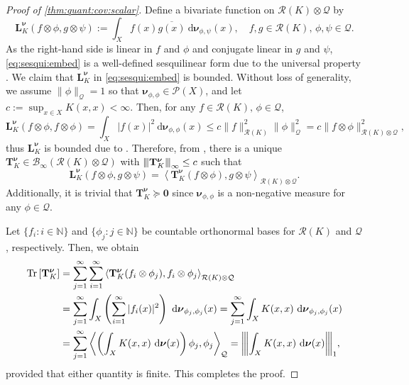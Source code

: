 \documentclass[noinfoline]{imsart}\setcounter{tocdepth}{2}
\renewcommand{\b}[1]{\mathbb{#1}} %
\newcommand{\m}[1]{\mathbf{#1}} %
\newcommand{\s}[1]{\mathscr{#1}} %
\renewcommand{\c}[1]{\mathcal{#1}} %
\newcommand{\mb}[1]{\boldsymbol{#1}} %
\newcommand{\rd}{\mathrm{d}} %
\newcommand{\tr}[1]{\operatorname{Tr}\left[#1\right]}
\newcommand{\vertiii}[1]{{\left\vert\kern-0.25ex\left\vert\kern-0.25ex\left\vert #1 
    \right\vert\kern-0.25ex\right\vert\kern-0.25ex\right\vert}} %
\newcommand{\innpr}[2]{{\left\langle {#1},{#2}\right\rangle}} %
\theoremstyle{plain}
\begin{document}
\begin{appendix}
\begin{proof}[Proof of \cref{thm:quant:cov:scalar}]
Define a bivariate function on $\c{R}(K) \otimes \c{Q}$ by
\begin{equation}\label{eq:sesqui:embed}
    \m{L}_{K}^{\mb{\nu}}(f \otimes \phi, g \otimes \psi) := \int_{X} f(x) \overline{g(x)} \ \rd \mb{\nu}_{\phi, \psi}(x), \quad f, g \in \c{R}(K), \, \phi,\psi \in \c{Q}.
\end{equation}
As the right-hand side is linear in $f$ and $\phi$ and conjugate linear in $g$ and $\psi$, \eqref{eq:sesqui:embed} is a well-defined sesquilinear form due to the universal property \cite{kadison1986fundamentals}.
We claim that $\m{L}_{K}^{\mb{\nu}}$ in \eqref{eq:sesqui:embed} is bounded. Without loss of generality, we assume $\|\phi\|_{\c{Q}} = 1$ so that $\mb{\nu}_{\phi,\phi} \in \s{P}(X)$, and let $c := \sup_{x \in X} K(x, x) < \infty$. Then, for any $f \in \c{R}(K), \, \phi \in \c{Q}$,
\begin{equation*}
    \m{L}_{K}^{\mb{\nu}}(f \otimes \phi, f \otimes \phi) = \int_{X} |f(x)|^{2} \ \rd \mb{\nu}_{\phi,\phi}(x) \le c \|f\|_{\c{R}(K)}^{2} \|\phi\|_{\c{Q}}^{2} =  c \|f \otimes \phi\|_{\c{R}(K) \otimes \c{Q}}^{2}, 
\end{equation*}
thus $\m{L}_{K}^{\mb{\nu}}$ is bounded due to \cite[Proposition A.61]{hall2013quantum}. Therefore, from \cite[Proposition A.63]{hall2013quantum}, there is a unique $\m{T}_{K}^{\mb{\nu}} \in \c{B}_{\infty}(\c{R}(K) \otimes \c{Q})$ with $\vertiii{\m{T}_{K}^{\mb{\nu}}}_{\infty} \le c$ such that 
\begin{equation*}
    \m{L}_{K}^{\mb{\nu}}(f \otimes \phi, g \otimes \psi) = \innpr{\m{T}_{K}^{\mb{\nu}} (f \otimes \phi)}{g \otimes \psi}_{\c{R}(K) \otimes \c{Q}}.
\end{equation*}
Additionally, it is trivial that $\m{T}_{K}^{\mb{\nu}} \succeq \m{0}$ since $\mb{\nu}_{\phi,\phi}$ is a non-negative measure for any $\phi \in \c{Q}$. 

Let $\{f_{i}: i \in \b{N} \}$ and $\{\phi_{j}: j \in \b{N}\}$ be countable orthonormal bases for $\c{R}(K)$ and $\c{Q}$, respectively. Then, we obtain
\begin{align*}
    \tr{\m{T}_{K}^{\mb{\nu}}} &= \sum_{j = 1}^{\infty} \sum_{i=1}^{\infty} \innpr{\m{T}_{K}^{\mb{\nu}} (f_{i} \otimes \phi_{j})}{f_{i} \otimes \phi_{j}}_{\c{R}(K) \otimes \c{Q}} \\
    &= \sum_{j = 1}^{\infty} \int_{X} \left( \sum_{i=1}^{\infty} |f_{i}(x)|^{2} \right) \ \rd \mb{\nu}_{\phi_{j}, \phi_{j}}(x) 
    = \sum_{j = 1}^{\infty} \int_{X} K(x, x) \ \rd \mb{\nu}_{\phi_{j}, \phi_{j}}(x) \\
    &= \sum_{j = 1}^{\infty} \innpr{\left(\int_{X} K(x, x) \ \rd \mb{\nu}(x) \right) \phi_{j}}{\phi_{j}}_{\c{Q}} = \vertiii{\int_{X} K(x, x) \ \rd \mb{\nu}(x)}_{1},
\end{align*}
provided that either quantity is finite. This completes the proof.
\end{proof}




\end{appendix}
\end{document}
